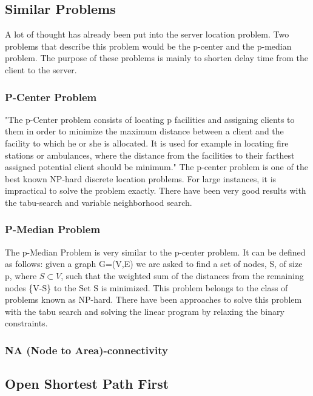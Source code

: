 \documentclass [12pt]{article}
\begin{document}
\subsection {Similar Problems}
A lot of thought has already been put into the server location problem.
Two problems that describe this problem would be the p-center and the
p-median problem. The purpose of these problems is mainly to shorten delay
time from the client to the server. 
\subsubsection {P-Center Problem}
"The p-Center problem consists of locating p facilities and assigning clients
to them in order to minimize the maximum distance between a client and the facility
to which he or she is allocated. It is used for example in locating fire stations or ambulances,
where the distance from the facilities 
to their farthest assigned potential client should be minimum."\cite{Mladenovic00solvingthe}
The p-center problem is one of the best known NP-hard discrete location problems.\cite{KarivHakimi1979}
For large instances, it is impractical to solve the problem exactly.
There have been very good results with the tabu-search and variable neighborhood search.
\cite{Mladenovic00solvingthe}
\subsubsection {P-Median Problem}
The p-Median Problem is very similar to the p-center problem. It can be defined as follows:
given a graph G=(V,E) we are asked to find a set of nodes, S, of size p, where $ S\subset V$, such that the weighted
sum of the distances from the remaining nodes \{V-S\} to the Set S is minimized. \cite{Rolland1997329}
This problem belongs to the class of problems known as NP-hard.\cite{KarivHakimi1979median} There have been
approaches to solve this problem with the tabu search \cite{Rolland1997329} and solving the linear program by
relaxing the binary constraints.\cite{rosing1979p}


\subsubsection {NA (Node to Area)-connectivity}
\subsection{Open Shortest Path First}
\end{document}

